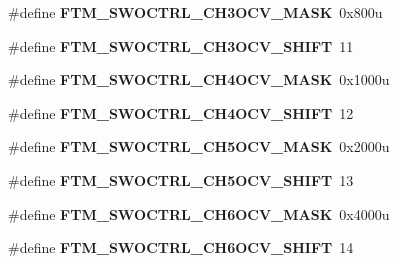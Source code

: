 \begin{DoxyCompactItemize}
\item 
\#define {\bfseries F\+T\+M\+\_\+\+S\+W\+O\+C\+T\+R\+L\+\_\+\+C\+H3\+O\+C\+V\+\_\+\+M\+A\+SK}~0x800u\hypertarget{group__FTM__Register__Masks_gaba02b117cc313564b3f2d67aa238a3ef}{}\label{group__FTM__Register__Masks_gaba02b117cc313564b3f2d67aa238a3ef}

\item 
\#define {\bfseries F\+T\+M\+\_\+\+S\+W\+O\+C\+T\+R\+L\+\_\+\+C\+H3\+O\+C\+V\+\_\+\+S\+H\+I\+FT}~11\hypertarget{group__FTM__Register__Masks_gaf19ff618a9c962801b0aba2036e48ec8}{}\label{group__FTM__Register__Masks_gaf19ff618a9c962801b0aba2036e48ec8}

\item 
\#define {\bfseries F\+T\+M\+\_\+\+S\+W\+O\+C\+T\+R\+L\+\_\+\+C\+H4\+O\+C\+V\+\_\+\+M\+A\+SK}~0x1000u\hypertarget{group__FTM__Register__Masks_ga5cc982d14b624ca50169e1c98d02e4ff}{}\label{group__FTM__Register__Masks_ga5cc982d14b624ca50169e1c98d02e4ff}

\item 
\#define {\bfseries F\+T\+M\+\_\+\+S\+W\+O\+C\+T\+R\+L\+\_\+\+C\+H4\+O\+C\+V\+\_\+\+S\+H\+I\+FT}~12\hypertarget{group__FTM__Register__Masks_ga38757966eb256ada3ab6800fdde3574f}{}\label{group__FTM__Register__Masks_ga38757966eb256ada3ab6800fdde3574f}

\item 
\#define {\bfseries F\+T\+M\+\_\+\+S\+W\+O\+C\+T\+R\+L\+\_\+\+C\+H5\+O\+C\+V\+\_\+\+M\+A\+SK}~0x2000u\hypertarget{group__FTM__Register__Masks_ga15f2f2e7d6753053cffd4cd6a2de90e5}{}\label{group__FTM__Register__Masks_ga15f2f2e7d6753053cffd4cd6a2de90e5}

\item 
\#define {\bfseries F\+T\+M\+\_\+\+S\+W\+O\+C\+T\+R\+L\+\_\+\+C\+H5\+O\+C\+V\+\_\+\+S\+H\+I\+FT}~13\hypertarget{group__FTM__Register__Masks_gae269ab2d5353429a637b5ec4fabd55d8}{}\label{group__FTM__Register__Masks_gae269ab2d5353429a637b5ec4fabd55d8}

\item 
\#define {\bfseries F\+T\+M\+\_\+\+S\+W\+O\+C\+T\+R\+L\+\_\+\+C\+H6\+O\+C\+V\+\_\+\+M\+A\+SK}~0x4000u\hypertarget{group__FTM__Register__Masks_ga3b9f11da0d8d83fba974c4aaba2dac8a}{}\label{group__FTM__Register__Masks_ga3b9f11da0d8d83fba974c4aaba2dac8a}

\item 
\#define {\bfseries F\+T\+M\+\_\+\+S\+W\+O\+C\+T\+R\+L\+\_\+\+C\+H6\+O\+C\+V\+\_\+\+S\+H\+I\+FT}~14\hypertarget{group__FTM__Register__Masks_ga5f2de43ea7c9508165b8829009f2171f}{}\label{group__FTM__Register__Masks_ga5f2de43ea7c9508165b8829009f2171f}


\end{DoxyCompactItemize}
